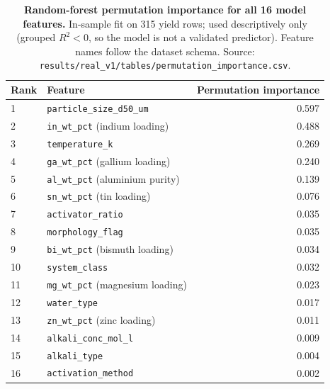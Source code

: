 \begin{table}[htbp]
\centering
\caption{\textbf{Random-forest permutation importance for all 16 model features.}
In-sample fit on 315 yield rows; used descriptively only (grouped $R^2 < 0$, so the
model is not a validated predictor). Feature names follow the dataset schema.
Source: \texttt{results/real\_v1/tables/permutation\_importance.csv}.}
\label{tab:si_perm_imp}
\begin{tabular}{llr}
\toprule
Rank & Feature & Permutation importance \\
\midrule
1  & \texttt{particle\_size\_d50\_um} & 0.597 \\
2  & \texttt{in\_wt\_pct} (indium loading)  & 0.488 \\
3  & \texttt{temperature\_k}               & 0.269 \\
4  & \texttt{ga\_wt\_pct} (gallium loading) & 0.240 \\
5  & \texttt{al\_wt\_pct} (aluminium purity)& 0.139 \\
6  & \texttt{sn\_wt\_pct} (tin loading)     & 0.076 \\
7  & \texttt{activator\_ratio}              & 0.035 \\
8  & \texttt{morphology\_flag}              & 0.035 \\
9  & \texttt{bi\_wt\_pct} (bismuth loading) & 0.034 \\
10 & \texttt{system\_class}                 & 0.032 \\
11 & \texttt{mg\_wt\_pct} (magnesium loading)& 0.023 \\
12 & \texttt{water\_type}                   & 0.017 \\
13 & \texttt{zn\_wt\_pct} (zinc loading)    & 0.011 \\
14 & \texttt{alkali\_conc\_mol\_l}           & 0.009 \\
15 & \texttt{alkali\_type}                  & 0.004 \\
16 & \texttt{activation\_method}            & 0.002 \\
\bottomrule
\end{tabular}
\end{table}
